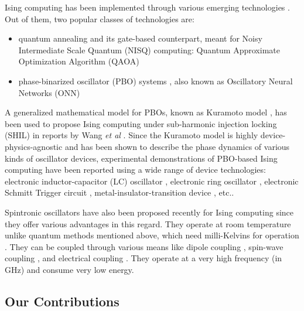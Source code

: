 \documentclass[10pt]{article}
\begin{document}
Ising computing has been implemented through various emerging technologies \cite{IsingComputingReview,GWvsSAvsCIM,CoherentIMvsQA}. Out of them, two popular classes of technologies are:

\begin{itemize}
    \item quantum annealing and its gate-based counterpart, meant for Noisy Intermediate Scale Quantum (NISQ) computing: Quantum Approximate Optimization Algorithm (QAOA) \cite{NISQReview,QAOA_Farhi} 
    \item phase-binarized oscillator (PBO) systems \cite{OscillatorIMReview}, also known as Oscillatory Neural Networks (ONN) \cite{SKONN_NCE}
\end{itemize}

 

A generalized mathematical model for PBOs, known as Kuramoto model \cite{Kuramoto}, has been used to propose  Ising computing under sub-harmonic injection locking (SHIL) in reports by Wang \textit{et al} \cite{Jaijeet1,Jaijeet2}. Since the Kuramoto model is highly device-physics-agnostic and has been shown to describe the phase dynamics of various kinds of oscillator devices, experimental demonstrations of PBO-based Ising computing have been reported using a wide range of device technologies: electronic inductor-capacitor (LC) oscillator \cite{Jaijeet3}, electronic ring oscillator \cite{RingOscApp,ChrisKim1,ChrisKim2}, electronic Schmitt Trigger circuit \cite{NikhilShukla1,SKONN_NCE}, metal-insulator-transition device \cite{MIT1,MIT2}, etc.. 

Spintronic oscillators have also been proposed recently for Ising computing \cite{Spin_Akerman1,Spin_Akerman2,Spin_Finocchio1,Spin_Finocchio2} since they offer various advantages in this regard. They operate at room temperature unlike quantum methods mentioned above, which need milli-Kelvins for operation \cite{NISQReview}. They can be coupled through various means like dipole coupling \cite{Spin_DB1,Spin_DB2,Spin_Ashwin}, spin-wave coupling \cite{Spin_Akerman1,Spin_Akerman2}, and electrical coupling \cite{Spin_Liu,Spin_Hyunsoo}. They operate at a very high frequency (in GHz) and consume very low energy.



\subsection{Our Contributions}
\end{document}
